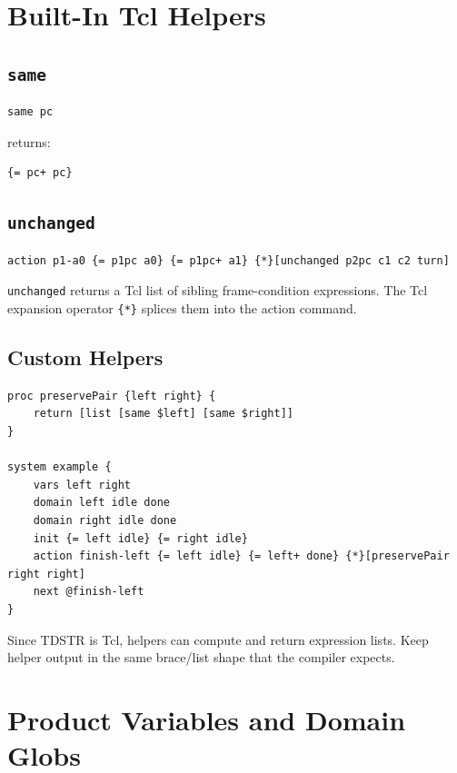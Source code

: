 \documentclass[11pt]{article}
\begin{document}
\section{Built-In Tcl Helpers}

\subsection{\texttt{same}}

\begin{lstlisting}[language=TDSTR]
same pc
\end{lstlisting}

returns:

\begin{lstlisting}[language=TDSTR]
{= pc+ pc}
\end{lstlisting}

\subsection{\texttt{unchanged}}

\begin{lstlisting}[language=TDSTR]
action p1-a0 {= p1pc a0} {= p1pc+ a1} {*}[unchanged p2pc c1 c2 turn]
\end{lstlisting}

\texttt{unchanged} returns a Tcl list of sibling frame-condition expressions.
The Tcl expansion operator \texttt{\{*\}} splices them into the action command.

\subsection{Custom Helpers}

\begin{lstlisting}[language=TDSTR]
proc preservePair {left right} {
    return [list [same $left] [same $right]]
}

system example {
    vars left right
    domain left idle done
    domain right idle done
    init {= left idle} {= right idle}
    action finish-left {= left idle} {= left+ done} {*}[preservePair right right]
    next @finish-left
}
\end{lstlisting}

Since TDSTR is Tcl, helpers can compute and return expression lists.  Keep
helper output in the same brace/list shape that the compiler expects.

\section{Product Variables and Domain Globs}
\end{document}
